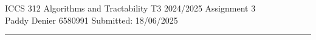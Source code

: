 \documentclass[12pt]{article}
\begin{document}
\noindent ICCS 312 Algorithms and Tractability T3 2024/2025 \hfill Assignment 3
\\
Paddy Denier 6580991 \hfill Submitted: 18/06/2025
\noindent\rule{\linewidth}{0.4pt}
\end{document}

